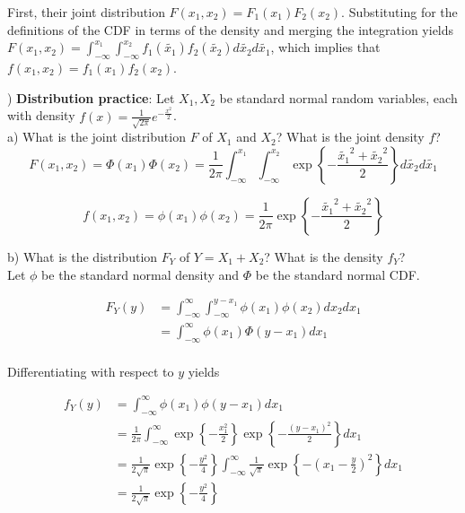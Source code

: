 \documentclass[12pt,english]{article}
\begin{document}
First, their joint distribution $F(x_{1}, x_{2}) = F_{1}(x_{1}) F_{2}(x_{2})$. Substituting for the definitions of the CDF in terms of the density and merging the integration yields $F(x_{1}, x_{2}) = \int_{-\infty}^{x_{1}} \int_{-\infty}^{x_{2}} f_{1}(\widetilde{x_{1}}) f_{2}(\widetilde{x_{2}}) d\widetilde{x_{2}} d\widetilde{x_{1}}$, which implies that $f(x_{1}, x_{2}) = f_{1}(x_{1}) f_{2}(x_{2})$.

\vspace{1em}
) \textbf{Distribution practice}: Let $X_{1}, X_{2}$ be standard normal random variables, each with density $f(x) = \frac{1}{\sqrt{2\pi}} e^{-\frac{x^{2}}{2}}$. \\
a) What is the joint distribution $F$ of $X_{1}$ and $X_{2}$? What is the joint density $f$? \\

$$ F(x_{1}, x_{2}) = \Phi(x_{1}) \Phi(x_{2}) =  \frac{1}{2\pi} \int_{-\infty}^{x_{1}} \int_{-\infty}^{x_{2}} \exp \left\{ -\frac{\widetilde{x_{1}}^{2} + \widetilde{x_{2}}^{2}}{2} \right\} d\widetilde{x_{2}} d\widetilde{x_{1}} $$

$$ f(x_{1}, x_{2}) = \phi(x_{1}) \phi(x_{2}) = \frac{1}{2\pi} \exp \left\{ -\frac{\widetilde{x_{1}}^{2} + \widetilde{x_{2}}^{2}}{2} \right\} $$

\vspace{1em}
\noindent
b) What is the distribution $F_{Y}$ of $Y = X_{1} + X_{2}$? What is the density $f_{Y}$? \\

Let $\phi$ be the standard normal density and $\Phi$ be the standard normal CDF.

\begin{align*}
F_{Y}(y) & = \int_{-\infty}^{\infty} \int_{-\infty}^{y - x_{1}} \phi(x_{1}) \phi(x_{2}) dx_{2} dx_{1} \\
& = \int_{-\infty}^{\infty} \phi(x_{1}) \Phi(y - x_{1}) dx_{1} \\
\end{align*}

Differentiating with respect to $y$ yields

\begin{align*}
f_{Y}(y) & = \int_{-\infty}^{\infty} \phi(x_{1}) \phi(y - x_{1}) dx_{1} \\
& = \frac{1}{2\pi} \int_{-\infty}^{\infty} \exp \left\{ -\frac{x_{1}^{2}}{2}\right\} \exp \left\{ -\frac{(y - x_{1})^{2}}{2}\right\} dx_{1} \\
& = \frac{1}{2\sqrt{\pi}} \exp \left\{ -\frac{y^{2}}{4} \right\} \int_{-\infty}^{\infty} \frac{1}{\sqrt{\pi}} \exp \left\{ - \left(x_{1} - \frac{y}{2} \right)^{2}\right\} dx_{1} \\
& = \frac{1}{2\sqrt{\pi}} \exp \left\{ -\frac{y^{2}}{4} \right\}
\end{align*}
\end{document}
